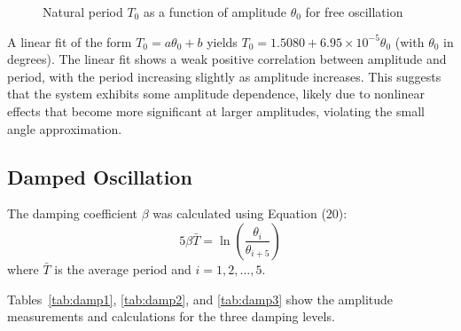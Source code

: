 \documentclass[12pt]{article}
\begin{document}
\begin{figure}[h]
\centering
{}
\caption{Natural period $T_0$ as a function of amplitude $\theta_0$ for free oscillation}
\label{fig:free_osc_plot}
\end{figure}

A linear fit of the form $T_0 = a\theta_0 + b$ yields $T_0 = 1.5080 + 6.95 \times 10^{-5}\theta_0$ (with $\theta_0$ in degrees). The linear fit shows a weak positive correlation between amplitude and period, with the period increasing slightly as amplitude increases. This suggests that the system exhibits some amplitude dependence, likely due to nonlinear effects that become more significant at larger amplitudes, violating the small angle approximation.

\subsection{Damped Oscillation}

The damping coefficient $\beta$ was calculated using Equation (20):
\begin{equation}
5\beta\bar{T} = \ln\left(\frac{\theta_i}{\theta_{i+5}}\right)
\end{equation}
where $\bar{T}$ is the average period and $i = 1, 2, \ldots, 5$.

Tables~\ref{tab:damp1}, \ref{tab:damp2}, and \ref{tab:damp3} show the amplitude measurements and calculations for the three damping levels.
\end{document}
